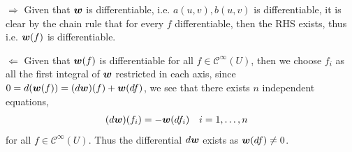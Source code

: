 \documentclass[11pt]{article}
\begin{document}
\begin{enumerate}
\begin{solution}
\begin{enumerate}
$\Rightarrow$ Given that $\boldsymbol{w}$ is differentiable, i.e. $a(u,v), b(u,v)$ is differentiable, it is clear by the chain rule that for every $f$ differentiable, then  the RHS exists, thus
i.e. $\boldsymbol{w}(f)$ is differentiable.

$\Leftarrow$  Given that $\boldsymbol{w}(f)$ is differentiable for all $f \in \mathcal{C}^{\infty}(U)$, then we choose $f_{i}$ as all the first integral of $\boldsymbol{w}$ restricted in each axis,  
since $0= d(\boldsymbol{w}(f)) = (d\boldsymbol{w})(f)+ \boldsymbol{w}(df)$, we see that there exists $n$ independent equations, 
\begin{align*}
(d\boldsymbol{w})(f_{i}) &= -\boldsymbol{w}(df_{i}) \quad i=1,\ldots,n
\end{align*}
for all $f\in \mathcal{C}^{\infty}(U)$. Thus the differential $d\boldsymbol{w}$ exists as $\boldsymbol{w}(df)\neq 0$. 

\end{enumerate}
\end{solution}
\end{enumerate}
\newpage


\end{document}
